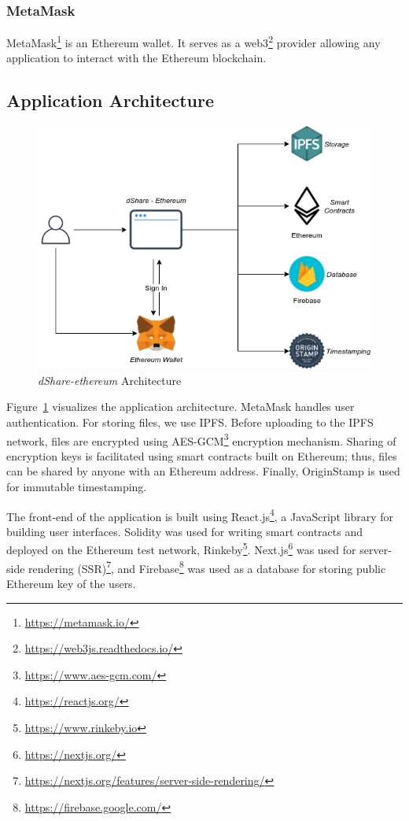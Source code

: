 \subsubsection{MetaMask}
MetaMask\footnote{\url{https://metamask.io/}} is an Ethereum wallet. It serves as a web3\footnote{\url{https://web3js.readthedocs.io/}} provider allowing any application to interact with the Ethereum blockchain.

\subsection{Application Architecture}

\begin{figure}[h]
	\includegraphics[width=\linewidth]{figures/dshare-ethereum}
	\caption{\label{fig:dshare-ethereum} \textit{dShare-ethereum} Architecture}
\end{figure}

Figure~\ref{fig:dshare-ethereum} visualizes the application architecture. MetaMask handles user authentication. For storing files, we use IPFS. Before uploading to the IPFS network, files are encrypted using AES-GCM\footnote{\url{https://www.aes-gcm.com/}} encryption mechanism. Sharing of encryption keys is facilitated using smart contracts built on Ethereum; thus, files can be shared by anyone with an Ethereum address. Finally, OriginStamp is used for immutable timestamping.

The front-end of the application is built using React.js\footnote{\url{https://reactjs.org/}}, a JavaScript library for building user interfaces. Solidity was used for writing smart contracts and deployed on the Ethereum test network, Rinkeby\footnote{\url{https://www.rinkeby.io}}. Next.js\footnote{\url{https://nextjs.org/}} was used for server-side rendering (SSR)\footnote{\url{https://nextjs.org/features/server-side-rendering/}}, and Firebase\footnote{\url{https://firebase.google.com/}} was used as a database for storing public Ethereum key of the users.

